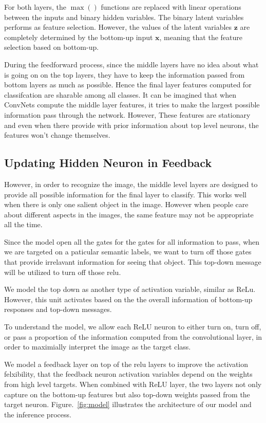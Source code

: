 For both layers, the $\max()$ functions are replaced with linear operations between the inputs and binary hidden variables. The binary latent variables performs as feature selection. However, the values of the latent variables $\mathbf{z}$ are completely determined by the bottom-up input $\mathbf{x}$, meaning that the feature selection based on bottom-up. 

During the feedforward process, since the middle layers have no idea about what is going on on the top layers, they have to keep the information passed from bottom layers as much as possible. Hence the final layer features computed for classifcation are sharable among all classes. It can be imagined that when ConvNets compute the middle layer features, it tries to make the largest possible information pass through the network. However, These features are stationary and even when there provide with prior information about top level neurons, the features won't change themselves.

\subsection{Updating Hidden Neuron in Feedback}
However, in order to recognize the image, the middle level layers are designed to provide all possible information for the final layer to classify. This works well when there is only one salient object in the image. However when people care about different aspects in the images, the same feature may not be appropriate all the time. 

Since the model open all the gates for the gates for all information to pass, when we are targeted on a paticular semantic labels, we want to turn off those gates that provide irrelavant information for seeing that object. This top-down message will be utilized to turn off those relu.

We model the top down as another type of activation variable, similar as ReLu. However, this unit activates based on the the overall information of bottom-up responses and top-down messages. 

To understand the model, we allow each ReLU neuron to either turn on, turn off, or pass a proportion of the information computed from the convolutional layer, in order to maximially interpret the image as the target class.

We model a feedback layer on top of the relu layers to improve the activation felxibility, that the feedback neuron activation variables depend on the weights from high level targets. When combined with ReLU layer, the two layers not only capture on the bottom-up features but also top-down weights passed from the target neuron. Figure.~\ref{fig:model} illustrates the architecture of our model and the inference process. 
 
